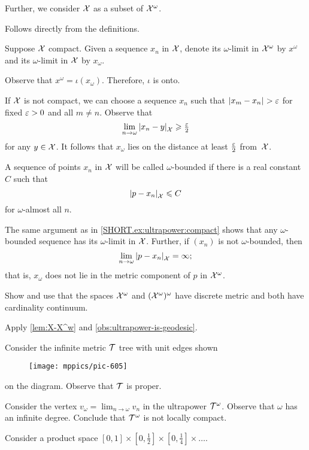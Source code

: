 Further, we consider $\mathcal{X}$ as a subset of $\mathcal{X}^\omega$.

 Follows directly from the definitions.

Suppose $\mathcal{X}$ compact.
Given a sequence $x_n$ in $\mathcal{X}$, denote its $\omega$-limit in $\mathcal{X}^\omega$ by $x^\omega$ and its $\omega$-limit in $\mathcal{X}$ by $x_\omega$.

Observe that $x^\omega=\iota(x_\omega)$.
Therefore, $\iota$ is onto.

If $\mathcal{X}$ is not compact, we can choose a sequence $x_n$ such that $\dist{x_m}{x_n}{}>\eps$ for fixed $\varepsilon>0$ and all $m\ne n$.
Observe that
\[\lim_{n\to\omega}\dist{x_n}{y}{\spc{X}}\ge \tfrac\eps2\]
for any $y\in\mathcal{X}$.
It follows that $x_\omega$ lies on the distance at least $\tfrac{\varepsilon}2$ from~$\mathcal{X}$.

A sequence of points $x_n$ in $\mathcal{X}$ will be called $\omega$-bounded if there is a real constant $C$ such that
\[\dist{p}{x_n}{\spc{X}}\le C\] 
for $\omega$-almost all $n$.

The same argument as in \ref{SHORT.ex:ultrapower:compact} shows that any $\omega$-bounded sequence has its $\omega$-limit in $\mathcal{X}$.
Further, if $(x_n)$ is not  $\omega$-bounded, then 
\[\lim_{n\to\omega}\dist{p}{x_n}{\spc{X}}=\infty;\]
that is, $x_\omega$ does not lie in the metric component of $p$ in $\mathcal{X}^\omega$.

 Show and use that the spaces $\mathcal{X}^\omega$ and $(\mathcal{X}^\omega)^\omega$ have discrete metric and both have cardinality continuum.

Apply \ref{lem:X-X^w} and \ref{obs:ultrapower-is-geodesic}.

 Consider the infinite metric $\mathcal{T}$ tree with unit edges shown
\begin{figure}[h!]
\vskip-0mm
\centering
\texttt{[image: mppics/pic-605]}
\end{figure}
on the diagram. Observe that $\mathcal{T}$ is proper.

Consider the vertex $v_\omega=\lim_{n\to\omega}v_n$ in the ultrapower $\mathcal{T}^\omega$.
Observe that $\omega$ has an infinite degree.
Conclude that $\mathcal{T}^\omega$ is not locally compact.

 Consider a product space $[0,1]\times[0,\tfrac12]\times[0,\tfrac14]\times\dots$.

